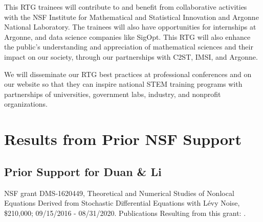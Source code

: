 \documentclass[11pt]{NSFamsart}
\begin{document}
This RTG trainees will contribute to and benefit from collaborative activities with the NSF Institute for Mathematical and Statistical Innovation  and Argonne National Laboratory. The trainees will also have opportunities for internships at Argonne, and data science companies like SigOpt. This RTG will also enhance the public’s understanding and appreciation of mathematical sciences and their impact on our society, through our partnerships with C2ST, IMSI, and Argonne. 
 
We will disseminate our RTG best practices at professional conferences and on our website so that they can inspire national STEM  training programs with partnerships of universities, government labs, industry, and nonprofit organizations.

 
\section{Results from Prior NSF Support}

 
  
 
\subsection*{Prior Support for Duan \& Li} NSF grant  DMS-1620449, Theoretical and Numerical Studies of Nonlocal Equations Derived from Stochastic Differential Equations with L\'evy Noise, \$210,000; 09/15/2016 - 08/31/2020. Publications Resulting from this grant:
 \cite{ChenWu, ChenXL2020,  DannyTesfay,GaoTing2016, Gao2016,    Liu2019LvyNI, Lv2016OnAS, QiaoDuan2018,Wang2018NumericalAF, YangDuanWiggins2020,ZhangZhuanDuan,ZhengDuan2017,ZhengYY2020}.

 
\end{document}
